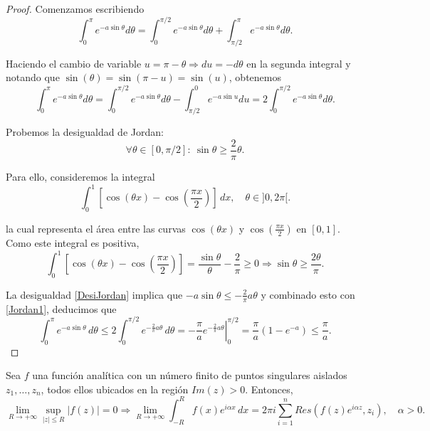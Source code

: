 \begin{proof}
Comenzamos escribiendo
$$\int_0^{\pi} e^{-a \sin \theta} d\theta = \int_0^{\pi/2} e^{-a \sin \theta} d\theta + \int_{\pi/2}^{\pi} e^{-a \sin \theta} d\theta.$$

Haciendo el cambio de variable $u = \pi - \theta \Rightarrow du = -d\theta$ en la segunda integral y notando que $\sin (\theta) = \sin(\pi - u) =  \sin(u)$, obtenemos
\begin{equation}
\int_0^{\pi} e^{-a \sin \theta} d\theta = \int_0^{\pi/2} e^{-a \sin \theta} d\theta - \int_{\pi/2}^{0} e^{-a \sin u} d u = 2 \int_0^{\pi/2} e^{-a \sin \theta} d\theta.    \label{Jordan1}
\end{equation}

Probemos la desigualdad de Jordan:
\begin{equation}
\forall \theta \in [0, \pi/2]:~ \sin \theta \geq \frac{2}{\pi} \theta.    \label{DesiJordan}
\end{equation}

Para ello, consideremos la integral
$$\int_0^1 \left[\cos(\theta x) - \cos\left( \frac{\pi x }{2}\right)\right]\,dx, \quad  \theta \in ]0,2\pi[.$$

la cual representa el área entre las curvas $\cos(\theta x)$ y $\cos\left( \frac{\pi x}{2}\right)$ en $[0,1]$. Como este integral es positiva,
$$\int_0^1 \left[\cos(\theta x) - \cos\left( \frac{\pi x }{2}\right)\right] = \frac{\sin \theta}{\theta} - \frac{2}{\pi} \geq 0 \Rightarrow \sin \theta \geq \frac{2\theta}{\pi} .$$

La desigualdad \eqref{DesiJordan} implica que $-a \sin \theta \leq - \frac{2}{\pi} a \theta$ y combinado esto con \eqref{Jordan1}, deducimos que
$$\int_{0}^{\pi} e^{-a \sin \theta} \,d \theta \leq 2 \int_{0}^{\pi/2} e^{- \frac{2}{\pi} a \theta} \,d\theta = \left. - \frac{\pi}{a} e^{-\frac{2}{\pi} a\theta}\right|_{0}^{\pi/2} = \frac{\pi}{a}(1-e^{-a}) \leq \frac{\pi}{a}.$$
\end{proof}

\begin{teorema}
Sea $f$ una función analítica con un número finito de puntos singulares aislados $z_1, \dots, z_n$, todos ellos ubicados en la región $Im(z) > 0$. Entonces,
$$\lim_{R\to + \infty} \sup_{|z| \leq R} |f(z)| = 0 \Rightarrow \lim_{R\to + \infty} \int_{-R}^R f(x) e^{i\alpha x}\,dx = 2\pi i \sum_{i=1}^n Res(f(z) e^{i\alpha z},z_i), \quad \alpha > 0.$$
\end{teorema}

